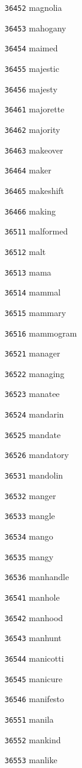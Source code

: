 \documentclass[twoside,11pt]{article}
\begin{document}
\begin{multicols}{5}
\begin{enumerate}
\item[\texttt{36452}] magnolia
\item[\texttt{36453}] mahogany
\item[\texttt{36454}] maimed
\item[\texttt{36455}] majestic
\item[\texttt{36456}] majesty
\item[\texttt{36461}] majorette
\item[\texttt{36462}] majority
\item[\texttt{36463}] makeover
\item[\texttt{36464}] maker
\item[\texttt{36465}] makeshift
\item[\texttt{36466}] making
\item[\texttt{36511}] malformed
\item[\texttt{36512}] malt
\item[\texttt{36513}] mama
\item[\texttt{36514}] mammal
\item[\texttt{36515}] mammary
\item[\texttt{36516}] mammogram
\item[\texttt{36521}] manager
\item[\texttt{36522}] managing
\item[\texttt{36523}] manatee
\item[\texttt{36524}] mandarin
\item[\texttt{36525}] mandate
\item[\texttt{36526}] mandatory
\item[\texttt{36531}] mandolin
\item[\texttt{36532}] manger
\item[\texttt{36533}] mangle
\item[\texttt{36534}] mango
\item[\texttt{36535}] mangy
\item[\texttt{36536}] manhandle
\item[\texttt{36541}] manhole
\item[\texttt{36542}] manhood
\item[\texttt{36543}] manhunt
\item[\texttt{36544}] manicotti
\item[\texttt{36545}] manicure
\item[\texttt{36546}] manifesto
\item[\texttt{36551}] manila
\item[\texttt{36552}] mankind
\item[\texttt{36553}] manlike

\end{enumerate}
\end{multicols}
\end{document}
